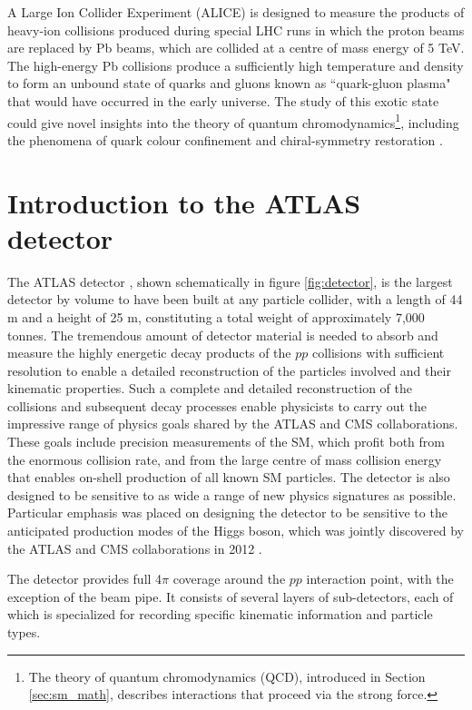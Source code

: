 A Large Ion Collider Experiment (ALICE) \cite{ALICE} is designed to measure the products of heavy-ion collisions produced during special LHC runs in which the proton beams are replaced by Pb beams, which are collided at a centre of mass energy of 5 TeV. The high-energy Pb collisions produce a sufficiently high temperature and density to form an unbound state of quarks and gluons known as ``quark-gluon plasma" that would have occurred in the early universe. The study of this exotic state could give novel insights into the theory of quantum chromodynamics\footnote{The theory of quantum chromodynamics (QCD), introduced in Section \ref{sec:sm_math}, describes interactions that proceed via the strong force.}, including the phenomena of quark colour confinement and chiral-symmetry restoration \cite{quark_confinement, Karsch:845568}.


\section{Introduction to the ATLAS detector}
\label{sec:ATLAS_detector_intro}

The ATLAS detector \cite{atlas}, shown schematically in figure \ref{fig:detector}, is the largest detector by volume to have been built at any particle collider, with a length of 44 m and a height of 25 m, constituting a total weight of approximately 7,000 tonnes. The tremendous amount of detector material is needed to absorb and measure the highly energetic decay products of the \(pp\) collisions with sufficient resolution to enable a detailed reconstruction of the particles involved and their kinematic properties. Such a complete and detailed reconstruction of the collisions and subsequent decay processes enable physicists to carry out the impressive range of physics goals shared by the ATLAS and CMS collaborations. These goals include precision measurements of the SM, which profit both from the enormous collision rate, and from the large centre of mass collision energy that enables on-shell production of all known SM particles. The detector is also designed to be sensitive to as wide a range of new physics signatures as possible. Particular emphasis was placed on designing the detector to be sensitive to the anticipated production modes of the Higgs boson, which was jointly discovered by the ATLAS and CMS collaborations in 2012 \cite{atlas_higgs, cms_higgs}. 

The detector provides full 4\(\pi\) coverage around the \(pp\) interaction point, with the exception of the beam pipe. It consists of several layers of sub-detectors, each of which is specialized for recording specific kinematic information and particle types.

